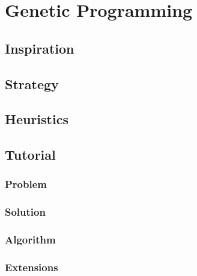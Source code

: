 
\section{Genetic Programming}

\subsection{Inspiration}


\subsection{Strategy}


\subsection{Heuristics}


\subsection{Tutorial}


\subsubsection{Problem}


\subsubsection{Solution}


\subsubsection{Algorithm}


\subsubsection{Extensions}